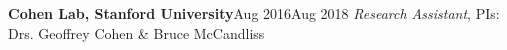 {\entrybig %
	{\textbf{Cohen Lab, Stanford University}}{Aug 2016\textendash Aug 2018}
	{\textit{Research Assistant}, PIs: Drs. Geoffrey Cohen \& Bruce McCandliss}{}
    
	


  
}









